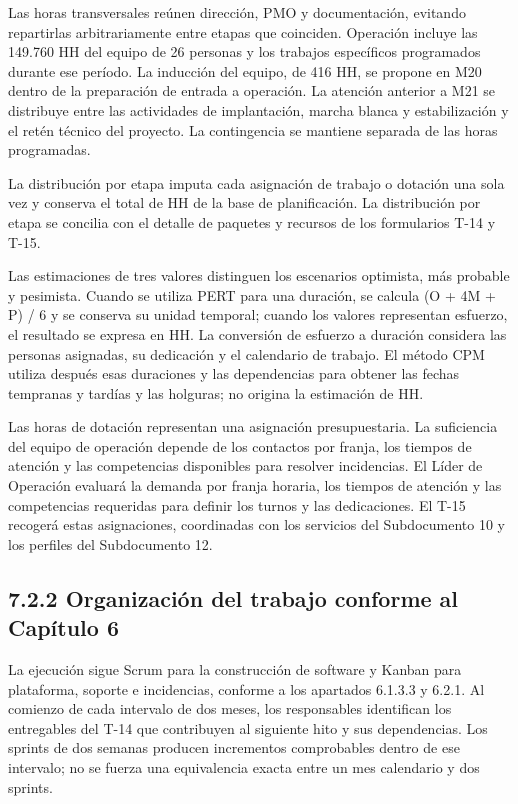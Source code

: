 \documentclass[11pt]{article}
\begin{document}
Las horas transversales reúnen dirección, PMO y documentación, evitando repartirlas arbitrariamente entre etapas que coinciden. Operación incluye las 149.760 HH del equipo de 26 personas y los trabajos específicos programados durante ese período. La inducción del equipo, de 416 HH, se propone en M20 dentro de la preparación de entrada a operación. La atención anterior a M21 se distribuye entre las actividades de implantación, marcha blanca y estabilización y el retén técnico del proyecto. La contingencia se mantiene separada de las horas programadas.

La distribución por etapa imputa cada asignación de trabajo o dotación una sola vez y conserva el total de HH de la base de planificación. La distribución por etapa se concilia con el detalle de paquetes y recursos de los formularios T-14 y T-15.

Las estimaciones de tres valores distinguen los escenarios optimista, más probable y pesimista. Cuando se utiliza PERT para una duración, se calcula (O + 4M + P) / 6 y se conserva su unidad temporal; cuando los valores representan esfuerzo, el resultado se expresa en HH. La conversión de esfuerzo a duración considera las personas asignadas, su dedicación y el calendario de trabajo. El método CPM utiliza después esas duraciones y las dependencias para obtener las fechas tempranas y tardías y las holguras; no origina la estimación de HH.

Las horas de dotación representan una asignación presupuestaria. La suficiencia del equipo de operación depende de los contactos por franja, los tiempos de atención y las competencias disponibles para resolver incidencias. El Líder de Operación evaluará la demanda por franja horaria, los tiempos de atención y las competencias requeridas para definir los turnos y las dedicaciones. El T-15 recogerá estas asignaciones, coordinadas con los servicios del Subdocumento 10 y los perfiles del Subdocumento 12.

\subsection{7.2.2 Organización del trabajo conforme al Capítulo 6}

La ejecución sigue Scrum para la construcción de software y Kanban para plataforma, soporte e incidencias, conforme a los apartados 6.1.3.3 y 6.2.1. Al comienzo de cada intervalo de dos meses, los responsables identifican los entregables del T-14 que contribuyen al siguiente hito y sus dependencias. Los sprints de dos semanas producen incrementos comprobables dentro de ese intervalo; no se fuerza una equivalencia exacta entre un mes calendario y dos sprints.
\end{document}
